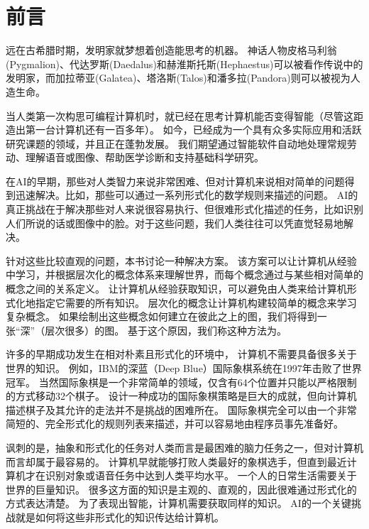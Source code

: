 \chapter{前言}
\label{chap:introduction}
远在古希腊时期，发明家就梦想着创造能思考的机器。
神话人物皮格马利翁(Pygmalion)、代达罗斯(Daedalus)和赫淮斯托斯(Hephaestus)可以被看作传说中的发明家，而加拉蒂亚(Galatea)、塔洛斯(Talos)和潘多拉(Pandora)则可以被视为人造生命\citep{ovid2004metamorphoses,sparkes1996red,1997works}。

当人类第一次构思可编程计算机时，就已经在思考计算机能否变得智能（尽管这距造出第一台计算机还有一百多年）\citep{Lovelace1842}。
如今，已经成为一个具有众多实际应用和活跃研究课题的领域，并且正在蓬勃发展。
我们期望通过智能软件自动地处理常规劳动、理解语音或图像、帮助医学诊断和支持基础科学研究。

在\gls{AI}的早期，那些对人类智力来说非常困难、但对计算机来说相对简单的问题得到迅速解决。比如，那些可以通过一系列形式化的数学规则来描述的问题。
\gls{AI}的真正挑战在于解决那些对人来说很容易执行、但很难形式化描述的任务，比如识别人们所说的话或图像中的脸。对于这些问题，我们人类往往可以凭直觉轻易地解决。


针对这些比较直观的问题，本书讨论一种解决方案。
该方案可以让计算机从经验中学习，并根据层次化的概念体系来理解世界，而每个概念通过与某些相对简单的概念之间的关系定义。
让计算机从经验获取知识，可以避免由人类来给计算机形式化地指定它需要的所有知识。
层次化的概念让计算机构建较简单的概念来学习复杂概念。
如果绘制出这些概念如何建立在彼此之上的图，我们将得到一张``深''（层次很多）的图。
基于这个原因，我们称这种方法为。


许多的早期成功发生在相对朴素且形式化的环境中， 计算机不需要具备很多关于世界的知识。
例如，IBM的深蓝（Deep Blue）国际象棋系统在1997年击败了世界冠军\citep{Hsu2002}。
当然国际象棋是一个非常简单的领域，仅含有64个位置并只能以严格限制的方式移动32个棋子。
设计一种成功的国际象棋策略是巨大的成就，但向计算机描述棋子及其允许的走法并不是挑战的困难所在。
国际象棋完全可以由一个非常简短的、完全形式化的规则列表来描述，并可以容易地由程序员事先准备好。

讽刺的是，抽象和形式化的任务对人类而言是最困难的脑力任务之一，但对计算机而言却属于最容易的。
计算机早就能够打败人类最好的象棋选手，但直到最近计算机才在识别对象或语音任务中达到人类平均水平。
一个人的日常生活需要关于世界的巨量知识。
很多这方面的知识是主观的、直观的，因此很难通过形式化的方式表达清楚。
为了表现出智能，计算机需要获取同样的知识。
\gls{AI}的一个关键挑战就是如何将这些非形式化的知识传达给计算机。

